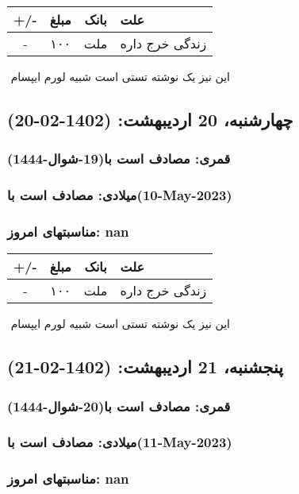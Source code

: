 \documentclass{article}
\newcommand{\rnote}[1]{\marginpar{\textcolor{color}{\StrSubstitute{\##1}{ }{\_}}}}
\newcommand{\myRow}[4]{
    #1 & #2 & #3 & #4 \\ \hline
}
\begin{document}
\begin{tabular}{ | c | c | c | p{5cm} |}
    \hline
    \myRow{ +/- }{مبلغ}{بانک}{علت}
    \myRow{-}{۱۰۰}{ملت}{زندگی خرج داره}
\end{tabular}
\newline
\newline

‌
\rnote{تست}
این نیز یک نوشته تستی است شبیه لورم ایپسام




\newpage
{}
\textcolor{color}{
\section{ چهارشنبه، 20 اردیبهشت: (1402-02-20) }
\subsubsection*{قمری: مصادف است با(19-شوال-1444)} 
\subsubsection*{میلادی: مصادف است با(10-May-2023)}
\subsubsection*{مناسبتهای امروز: nan}
}


\begin{tabular}{ | c | c | c | p{5cm} |}
    \hline
    \myRow{ +/- }{مبلغ}{بانک}{علت}
    \myRow{-}{۱۰۰}{ملت}{زندگی خرج داره}
\end{tabular}
\newline
\newline

‌
\rnote{تست}
این نیز یک نوشته تستی است شبیه لورم ایپسام




\newpage
{}
\textcolor{color}{
\section{ پنجشنبه، 21 اردیبهشت: (1402-02-21) }
\subsubsection*{قمری: مصادف است با(20-شوال-1444)} 
\subsubsection*{میلادی: مصادف است با(11-May-2023)}
\subsubsection*{مناسبتهای امروز: nan}
}
\end{document}
